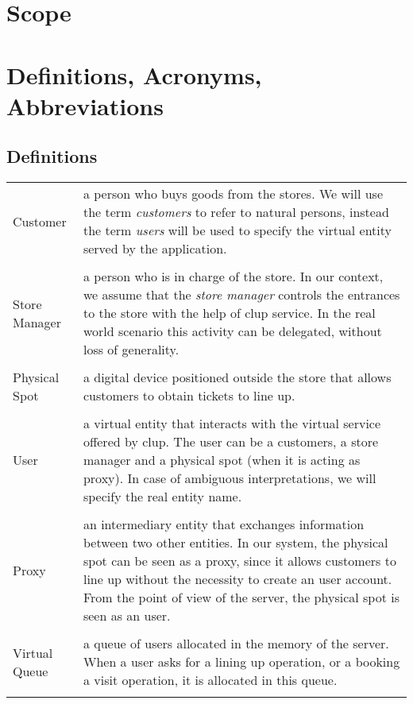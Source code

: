 \section{Scope}

\section{Definitions, Acronyms, Abbreviations}

\subsection{Definitions}

\begin{tabularx}{\textwidth}{ >{\hsize=0.2\textwidth}X >{\hsize=0.8\textwidth}X}
  Customer & a person who buys goods from the stores. We will use the term \textit{customers} to refer to natural persons, instead the term \textit{users} will be used to specify the virtual entity served by the application.\\ \\
  Store Manager & a person who is in charge of the store. In our context, we assume that the \textit{store manager} controls the entrances to the store with the help of \gls{clup} service. In the real world scenario this activity can be delegated, without loss of generality.\\ \\
  Physical Spot & a digital device positioned outside the store that allows customers to obtain tickets to line up.\\ \\
  User & a virtual entity that interacts with the virtual service offered by \gls{clup}. The user can be a customers, a store manager and a physical spot (when it is acting as proxy). In case of ambiguous interpretations, we will specify the real entity name.\\ \\
  Proxy & an intermediary entity that exchanges information between two other entities. In our system, the physical spot can be seen as a proxy, since it allows customers to line up without the necessity to create an user account. From the point of view of the server, the physical spot is seen as an user.\\ \\
  Virtual Queue & a queue of users allocated in the memory of the server. When a user asks for a lining up operation, or a booking a visit operation, it is allocated in this queue.\\ \\

\end{tabularx}
